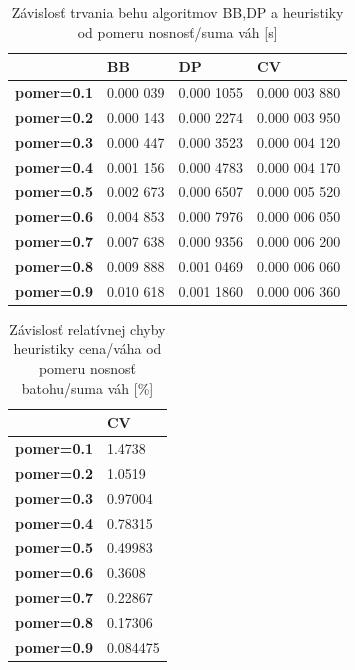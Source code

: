 \documentclass[slovak]{article}
\begin{document}
\begin{table}[htb!]\centering
	\begin{tabularx}{\textwidth}{ | X | X | X | X |}
	  \hline                       
							& \textbf{BB} 	& \textbf{DP} 	& \textbf{CV} 	\\ \hline
		\textbf{pomer=0.1}	&	0.000 039		&		0.000 1055		&	0.000 003 880			\\ \hline
		\textbf{pomer=0.2}	&	0.000 143		&		0.000 2274		&	0.000 003 950			\\ \hline
		\textbf{pomer=0.3}	&	0.000 447		&		0.000 3523		&	0.000 004 120			\\ \hline
		\textbf{pomer=0.4}	&	0.001 156		&		0.000 4783		&	0.000 004 170			\\ \hline
		\textbf{pomer=0.5}	&	0.002 673		&		0.000 6507		&	0.000 005 520			\\ \hline
		\textbf{pomer=0.6}	&	0.004 853		&		0.000 7976		&	0.000 006 050			\\ \hline
		\textbf{pomer=0.7}	&	0.007 638		&		0.000 9356		&	0.000 006 200			\\ \hline
		\textbf{pomer=0.8}	&	0.009 888		&		0.001 0469		&	0.000 006 060			\\ \hline
		\textbf{pomer=0.9}	&	0.010 618		&		0.001 1860		&	0.000 006 360			\\ \hline
	\end{tabularx}
\caption{Závislosť trvania behu algoritmov BB,DP a heuristiky od pomeru nosnosť/suma váh [s]}
\label{tab5}
\end{table}

\begin{table}[htb!]\centering
	\begin{tabularx}{\textwidth}{ | X | X | }
	  \hline                       
							& \textbf{CV} 	\\ \hline
		\textbf{pomer=0.1}	&	1.4738
			\\ \hline
		\textbf{pomer=0.2}	&	1.0519
			\\ \hline
		\textbf{pomer=0.3}	&	0.97004
			\\ \hline
		\textbf{pomer=0.4}	&	0.78315
			\\ \hline
		\textbf{pomer=0.5}	&	0.49983
			\\ \hline
		\textbf{pomer=0.6}	&	0.3608
			\\ \hline
		\textbf{pomer=0.7}	&	0.22867
			\\ \hline
		\textbf{pomer=0.8}	&	0.17306
			\\ \hline
		\textbf{pomer=0.9}	&	0.084475
			\\ \hline
	\end{tabularx}
\caption{Závislosť relatívnej chyby heuristiky cena/váha od pomeru nosnosť batohu/suma váh [\%]}
\label{tab6}
\end{table}
\end{document}
